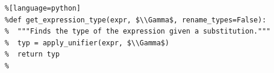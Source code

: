 \documentclass[border=10pt]{standalone}
\begin{document}
\begin{lstlisting}
%[language=python]
%def get_expression_type(expr, $\\Gamma$, rename_types=False):
%  """Finds the type of the expression given a substitution."""
%  typ = apply_unifier(expr, $\\Gamma$)
%  return typ     
%
\end{lstlisting}
\end{document}
